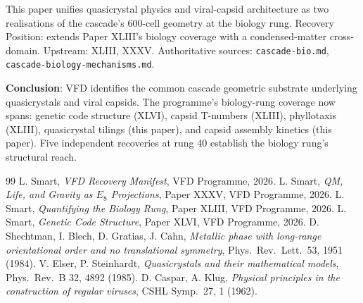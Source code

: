 \documentclass[12pt]{article}
\theoremstyle{remark}
\begin{document}
This paper unifies quasicrystal physics and viral-capsid architecture as two realisations of the cascade's 600-cell geometry at the biology rung. Recovery Position: extends Paper XLIII's biology coverage with a condensed-matter cross-domain. Upstream: XLIII, XXXV. Authoritative sources: \texttt{cascade-bio.md}, \texttt{cascade-biology-mechanisms.md}.

\textbf{Conclusion}: VFD identifies the common cascade geometric substrate underlying quasicrystals and viral capsids. The programme's biology-rung coverage now spans: genetic code structure (XLVI), capsid T-numbers (XLIII), phyllotaxis (XLIII), quasicrystal tilings (this paper), and capsid assembly kinetics (this paper). Five independent recoveries at rung 40 establish the biology rung's structural reach.


\begin{thebibliography}{99}
 L. Smart, \emph{VFD Recovery Manifest}, VFD Programme, 2026.
 L. Smart, \emph{QM, Life, and Gravity as $E_8$ Projections}, Paper XXXV, VFD Programme, 2026.
 L. Smart, \emph{Quantifying the Biology Rung}, Paper XLIII, VFD Programme, 2026.
 L. Smart, \emph{Genetic Code Structure}, Paper XLVI, VFD Programme, 2026.
 D. Shechtman, I. Blech, D. Gratias, J. Cahn, \emph{Metallic phase with long-range orientational order and no translational symmetry}, Phys.\ Rev.\ Lett.\ 53, 1951 (1984).
 V. Elser, P. Steinhardt, \emph{Quasicrystals and their mathematical models}, Phys.\ Rev.\ B 32, 4892 (1985).
 D. Caspar, A. Klug, \emph{Physical principles in the construction of regular viruses}, CSHL Symp.\ 27, 1 (1962).
\end{thebibliography}
\end{document}
